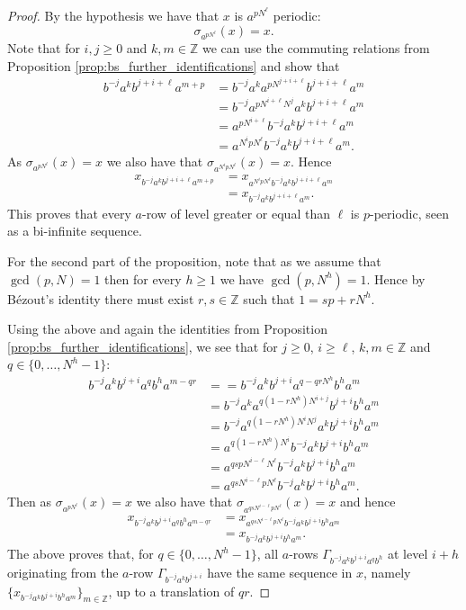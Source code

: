 \documentclass{aims}
\theoremstyle{definition}
\begin{document}
\begin{proof}
	By the hypothesis we have that $x$ is $a^{pN^\ell}$ periodic: 
	$$\sigma_{a^{pN^\ell}}(x)=x.$$
	Note that for $i,j\ge 0$ and $k,m\in \mathbb{Z}$ we can use the commuting relations from Proposition \ref{prop:bs_further_identifications} and show that
	\begin{align*}
	b^{-j}a^kb^{j+i+\ell}a^{m+p}&=b^{-j}a^ka^{pN^{j+i+\ell}}b^{j+i+\ell}a^{m}\\
	&=b^{-j}a^{pN^{i+\ell}N^j}a^{k}b^{j+i+\ell}a^{m}\\
	&=a^{pN^{i+\ell}}b^{-j}a^{k}b^{j+i+\ell}a^{m}\\
	&=a^{N^{i}pN^{\ell}}b^{-j}a^{k}b^{j+i+\ell}a^{m}.
	\end{align*}
	As $\sigma_{a^{pN^{\ell}}}(x)=x$ we also have that $\sigma_{a^{N^{i}pN^{\ell}}}(x)=x$. Hence
	\begin{align*}
	x_{b^{-j}a^kb^{j+i+\ell}a^{m+p}}&=x_{a^{N^{i}pN^{\ell}}b^{-j}a^{k}b^{j+i+\ell}a^{m}}\\
	&=x_{b^{-j}a^{k}b^{j+i+\ell}a^{m}}.
	\end{align*}
	This proves that every $a$-row of level greater or equal than $\ell$ is $p$-periodic, seen as a bi-infinite sequence.
	
	
	For the second part of the proposition, note that as we assume that $\gcd(p,N)=1$ then for every $h\ge 1$ we have $\gcd(p,N^h)=1$. Hence by Bézout's identity there must exist $r,s\in \mathbb{Z}$ such that $1=sp+rN^h$. 
	
	
	Using the above and again the identities from Proposition \ref{prop:bs_further_identifications}, we see that for $j\ge 0$, $i\ge \ell$, $k,m\in \mathbb{Z}$ and $q\in \{0,\ldots,N^h-1\}$:
	\begin{align*}
	b^{-j}a^{k}b^{j+i}a^{q}b^{h}a^{m-qr}&==b^{-j}a^{k}b^{j+i}a^{q-qrN^h}b^{h}a^{m}\\
	&=b^{-j}a^{k}a^{q(1-rN^{h})N^{i+j}}b^{j+i}b^{h}a^{m}\\
	&=b^{-j}a^{q(1-rN^{h})N^{i}N^{j}}a^{k}b^{j+i}b^{h}a^{m}\\	
	&=a^{q(1-rN^{h})N^{i}}b^{-j}a^{k}b^{j+i}b^{h}a^{m}\\
	&=a^{qspN^{i-\ell}N^{\ell}}b^{-j}a^{k}b^{j+i}b^{h}a^{m}\\
	&=a^{qsN^{i-\ell}pN^{\ell}}b^{-j}a^{k}b^{j+i}b^{h}a^{m}.				
	\end{align*}
	Then as $\sigma_{a^{pN^\ell}}(x)=x$ we also have that $\sigma_{a^{qsN^{i-\ell}pN^{\ell}}}(x)=x$ and hence
	\begin{align*}
	x_{b^{-j}a^{k}b^{j+i}a^{q}b^{h}a^{m-qr}}&=x_{a^{qsN^{i-\ell}pN^{\ell}}b^{-j}a^{k}b^{j+i}b^{h}a^{m}}\\
	&=x_{b^{-j}a^{k}b^{j+i}b^{h}a^{m}}.
	\end{align*}
	The above proves that, for $q\in \{0,\ldots,N^h-1\}$, all $a$-rows $\Gamma_{b^{-j}a^kb^{j+i}a^qb^h}$ at level $i+h$ originating from the $a$-row $\Gamma_{b^{-j}a^kb^{j+i}}$ have the same sequence in $x$, namely $\{x_{b^{-j}a^{k}b^{j+i}b^{h}a^{m}}\}_{m\in \mathbb{Z}}$, up to a translation of $qr$.
\end{proof}
\end{document}
